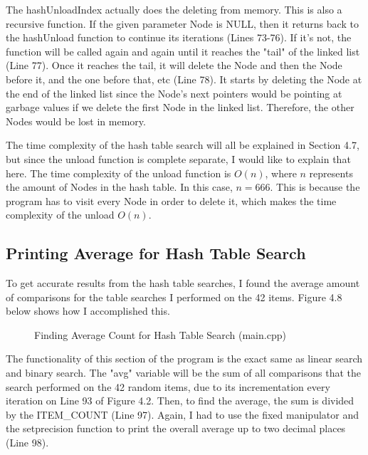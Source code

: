 \documentclass[letterpaper, 10pt]{article}
\begin{document}
\vspace{1em}

\noindent
The hashUnloadIndex actually does the deleting from memory. This is also a recursive function. If the given parameter Node is NULL, then it returns back to the hashUnload function to continue its iterations (Lines 73-76). If it's not, the function will be called again and again until it reaches the "tail" of the linked list (Line 77). Once it reaches the tail, it will delete the Node and then the Node before it, and the one before that, etc (Line 78). It starts by deleting the Node at the end of the linked list since the Node's next pointers would be pointing at garbage values if we delete the first Node in the linked list. Therefore, the other Nodes would be lost in memory.

\vspace{1em}

\noindent
The time complexity of the hash table search will all be explained in Section 4.7, but since the unload function is complete separate, I would like to explain that here. The time complexity of the unload function is $O(n)$, where $n$ represents the amount of Nodes in the hash table. In this case, $n = 666$. This is because the program has to visit every Node in order to delete it, which makes the time complexity of the unload $O(n)$.

\subsection{Printing Average for Hash Table Search}
\noindent
To get accurate results from the hash table searches, I found the average amount of comparisons for the table searches I performed on the 42 items. Figure 4.8 below shows how I accomplished this.

\begin{figure}[H]
  \centering
   
  \caption{Finding Average Count for Hash Table Search (main.cpp)}
  \label{fig:figure4.8}
\end{figure}

\noindent
The functionality of this section of the program is the exact same as linear search and binary search. The "avg" variable will be the sum of all comparisons that the search performed on the 42 random items, due to its incrementation every iteration on Line 93 of Figure 4.2. Then, to find the average, the sum is divided by the ITEM\_COUNT (Line 97). Again, I had to use the fixed manipulator and the setprecision function to print the overall average up to two decimal places (Line 98).
\end{document}
